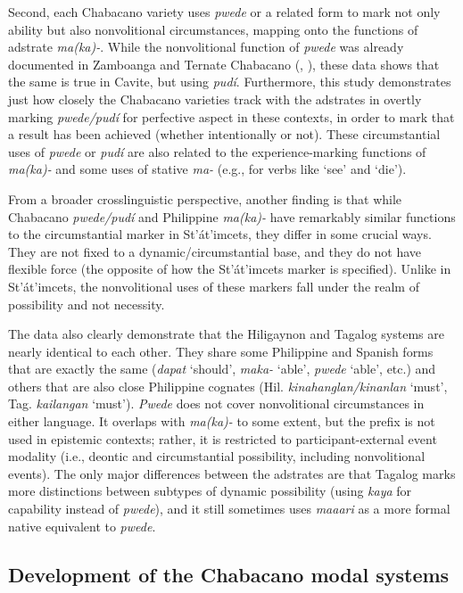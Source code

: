 \documentclass[output=paper,colorlinks,citecolor=brown]{langscibook}
\begin{document}
Second, each Chabacano variety uses \textit{pwede} or a related form to mark not only ability but also nonvolitional circumstances, mapping onto the functions of adstrate \textit{ma(ka)-}. While the nonvolitional function of \textit{pwede} was already documented in Zamboanga and Ternate Chabacano (\citealt{Rubino2008}, \citealt{Sippola2011}), these data shows that the same is true in Cavite, but using \textit{pudí}. Furthermore, this study demonstrates just how closely the Chabacano varieties track with the adstrates in overtly marking \textit{pwede/pudí} for perfective aspect in these contexts, in order to mark that a result has been achieved (whether intentionally or not). These circumstantial uses of \textit{pwede} or \textit{pudí} are also related to the experience-marking functions of \textit{ma(ka)-} and some uses of stative \textit{ma-} (e.g., for verbs like ‘see’ and ‘die’). 

From a broader crosslinguistic perspective, another finding is that while Chabacano \textit{pwede/pudí} and Philippine \textit{ma(ka)-} have remarkably similar functions to the circumstantial marker in St’át’imcets, they differ in some crucial ways. They are not fixed to a dynamic/circumstantial base, and they do not have flexible force (the opposite of how the St’át’imcets marker is specified). Unlike in St’át’imcets, the nonvolitional uses of these markers fall under the realm of possibility and not necessity.

The data also clearly demonstrate that the Hiligaynon and Tagalog systems are nearly identical to each other. They share some Philippine and Spanish forms that are exactly the same (\textit{dapat} ‘should', \textit{maka-} ‘able', \textit{pwede} ‘able', etc.) and others that are also close Philippine cognates (Hil. \textit{kinahanglan/kinanlan} ‘must', Tag. \textit{kailangan} ‘must'). \textit{Pwede} does not cover nonvolitional circumstances in either language. It overlaps with \textit{ma(ka)-} to some extent, but the prefix is not used in epistemic contexts; rather, it is restricted to participant-external event modality (i.e., deontic and circumstantial possibility, including nonvolitional events). The only major differences between the adstrates are that Tagalog marks more distinctions between subtypes of dynamic possibility (using \textit{kaya} for capability instead of \textit{pwede}), and it still sometimes uses \textit{maaari} as a more formal native equivalent to \textit{pwede}.

\subsection{Development of the Chabacano modal systems}
\end{document}
